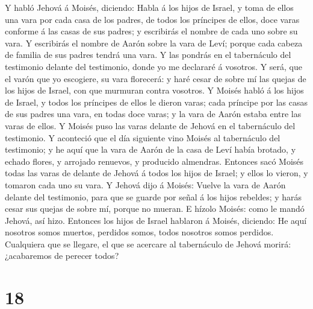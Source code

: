  Y habló Jehová á Moisés, diciendo:  Habla á los
hijos de Israel, y toma de ellos una vara por cada casa de los padres,
de todos los príncipes de ellos, doce varas conforme á las casas de sus
padres; y escribirás el nombre de cada uno sobre su vara.  Y
escribirás el nombre de Aarón sobre la vara de Leví; porque cada cabeza
de familia de sus padres tendrá una vara.  Y las pondrás en
el tabernáculo del testimonio delante del testimonio, donde yo me
declararé á vosotros.  Y será, que el varón que yo
escogiere, su vara florecerá: y haré cesar de sobre mí las quejas de los
hijos de Israel, con que murmuran contra vosotros.  Y Moisés
habló á los hijos de Israel, y todos los príncipes de ellos le dieron
varas; cada príncipe por las casas de sus padres una vara, en todas doce
varas; y la vara de Aarón estaba entre las varas de ellos. 
Y Moisés puso las varas delante de Jehová en el tabernáculo del
testimonio.  Y aconteció que el día siguiente vino Moisés al
tabernáculo del testimonio; y he aquí que la vara de Aarón de la casa de
Leví había brotado, y echado flores, y arrojado renuevos, y producido
almendras.  Entonces sacó Moisés todas las varas de delante
de Jehová á todos los hijos de Israel; y ellos lo vieron, y tomaron cada
uno su vara.  Y Jehová dijo á Moisés: Vuelve la vara de
Aarón delante del testimonio, para que se guarde por señal á los hijos
rebeldes; y harás cesar sus quejas de sobre mí, porque no mueran.
 E hízolo Moisés: como le mandó Jehová, así hizo.
 Entonces los hijos de Israel hablaron á Moisés, diciendo:
He aquí nosotros somos muertos, perdidos somos, todos nosotros somos
perdidos.  Cualquiera que se llegare, el que se acercare al
tabernáculo de Jehová morirá: ¿acabaremos de perecer todos?

\hypertarget{section-17}{%
\section{18}\label{section-17}}

